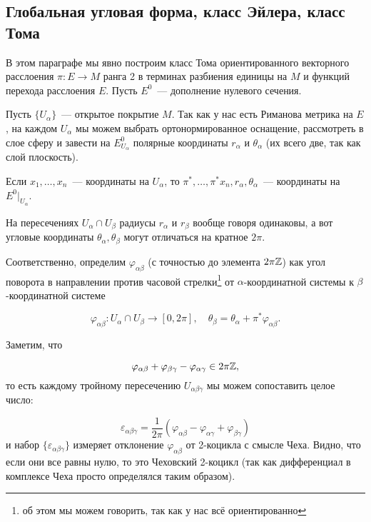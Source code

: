 
	
	\subsection{Глобальная угловая форма, класс Эйлера, класс Тома}

	В этом параграфе мы явно построим класс Тома ориентированного векторного расслоения $\pi\colon E \to M$ ранга 2 в терминах разбиения единицы на $M$ и функций перехода расслоения $E$. Пусть $E^0$~--- дополнение нулевого сечения. 

	Пусть $\{ U_{\alpha} \}$~--- открытое покрытие $M$. Так как у нас есть Риманова метрика на $E$, на каждом $U_{\alpha}$ мы можем выбрать ортонормированное оснащение, рассмотреть в слое сферу и завести на $E^{0}_{U_{\alpha}}$ полярные координаты $r_{\alpha}$ и $\theta_{\alpha}$ (их всего две, так как слой плоскость). 

	Если $x_1, \ldots, x_n$~--- координаты на $U_{\alpha}$, то $\pi^*,\ldots, \pi^*x_n, r_{\alpha}, \theta_{\alpha}$~--- координаты на $E^0\vert_{U_{\alpha}}$. 

	На пересечениях $U_{\alpha} \cap U_{\beta}$ радиусы $r_{\alpha}$ и $r_{\beta}$ вообще говоря одинаковы, а вот угловые координаты $\theta_{\alpha}, \theta_{\beta}$ могут отличаться на кратное $2\pi$. 

	Соответственно, определим $\varphi_{\alpha \beta}$ (с точностью до элемента $2\pi\mathbb{Z}$) как угол поворота в направлении против часовой стрелки\footnote{об этом мы можем говорить, так как у нас всё ориентированно} от $\alpha$-координатной системы к $\beta$-координатной системе 

	\[
		\varphi_{\alpha \beta}\colon U_{\alpha} \cap U_{\beta} \to [0, 2\pi], \quad \theta_{\beta} = \theta_{\alpha} + \pi^* \varphi_{\alpha \beta}.
	\]

	Заметим, что 

	\[
		\varphi_{\alpha \beta} + \varphi_{\beta \gamma} - \varphi_{\alpha \gamma} \in 2\pi\mathbb{Z},
	\]
	то есть каждому тройному пересечению $U_{\alpha \beta \gamma}$ мы можем сопоставить целое число: 

	\[
		\varepsilon_{\alpha \beta \gamma} = \frac{1}{2\pi}(\varphi_{\alpha \beta } - \varphi_{\alpha \gamma} + \varphi_{\beta \gamma}) 
	\]
	и набор $\{ \varepsilon_{\alpha \beta \gamma} \}$ измеряет отклонение  $\varphi_{\alpha \beta}$ от 2-коцикла с смысле Чеха. Видно, что если они все равны нулю, то это Чеховский 2-коцикл (так как дифференциал в комплексе Чеха просто определялся таким образом). 

